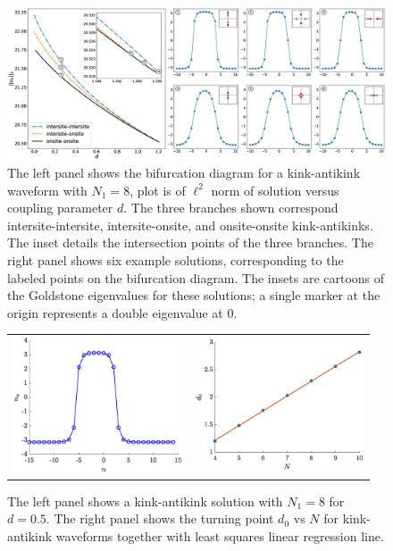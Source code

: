 \documentclass[12pt,reqno]{amsart}
\begin{document}
\begin{figure}[H]
	\begin{center}
	\includegraphics[width=16.5cm]{SGbifdiag.eps}
	\end{center}
	\caption{The left panel shows the bifurcation diagram for a kink-antikink waveform
	with $N_1 = 8$, plot is of $\ell^2$ norm of solution versus coupling parameter $d$. The three branches shown correspond intersite-intersite, intersite-onsite, and onsite-onsite kink-antikinks. The inset details the intersection points of the three branches. The right panel shows six example solutions, corresponding to the labeled points on the bifurcation diagram. The insets are cartoons of the Goldstone eigenvalues for these solutions; a single marker at the origin represents a double eigenvalue at 0.}
	\label{fig:SGbifdiag}
\end{figure}

\begin{figure}[H]
	\begin{center}
	\begin{tabular}{cc}
	\includegraphics[width=5cm]{2kink.eps} &
	\includegraphics[width=5cm]{kakd0vsN.eps}
	\end{tabular}
	\end{center}
	\caption{The left panel shows a kink-antikink solution with $N_1 = 8$ for $d = 0.5$. The right panel shows the turning point $d_0$ vs $N$ for kink-antikink waveforms together with least squares linear regression line.}
	\label{fig:kak}
\end{figure}
\end{document}
